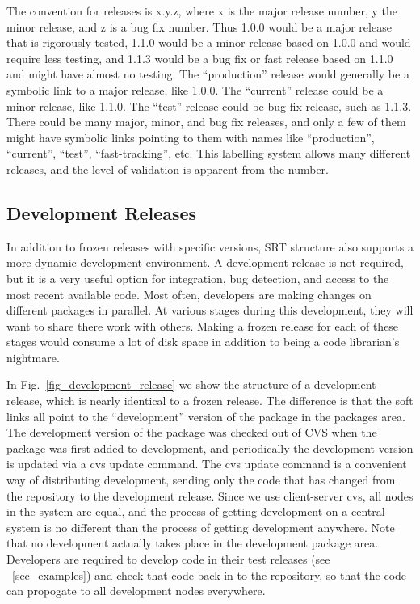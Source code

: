 \documentclass[12pt]{article}
\begin{document}
The convention for releases is x.y.z, where x is the 
major release number,
y the minor release, and z is a bug fix 
number. Thus 1.0.0 would be a major
release that is rigorously tested,  1.1.0 would be a minor release based on 
1.0.0 and would require less testing, and 1.1.3 would be a bug fix or fast 
release based on 1.1.0 and might have almost no testing.  The ``production''
release would generally be a symbolic link to a major release, like 1.0.0.
The ``current'' release could be a minor release, like 1.1.0. The ``test'' release 
could be bug fix release, such as 1.1.3.  There could be many major, minor,
and bug fix releases, and only a few of them might have symbolic links pointing
to them with names like ``production'', ``current'', ``test'',
``fast-tracking'', etc.
This labelling system allows many different releases, and the level of
validation is apparent from the number.

\subsection{Development Releases}
\label{sec_development}

In addition to frozen releases with specific versions, SRT structure
also supports a more dynamic development environment. A development release is 
not required, but it is a very useful option for integration, bug detection,
and access to the most recent available code. Most often, 
developers are making changes on different packages in parallel. At
various stages during this development, they will want to share there
work with others. Making a frozen release for each of these stages
would consume a lot of disk space in addition to being a code librarian's
nightmare. 

In Fig.~\ref{fig_development_release} we show the structure of a development
release, which is nearly identical to a frozen release.  The difference is that
the soft links all point to the ``development'' version of the package in the
packages area.  The development version of the package was checked out of
CVS when the package was first added to development, and periodically the 
development version is updated via a {\ttfamily cvs update} command. The 
{\ttfamily cvs update} command is a convenient way of distributing 
development, sending only the code that has changed from the repository to the 
development release.  Since we use client-server cvs, all nodes in the system 
are equal, and the process of getting development on a central system is no 
different than the process of getting development anywhere.  Note that no
development actually takes place in the development package area. Developers
are required to develop code in their test releases (see ~\ref{sec_examples}) and check
that code back in to the repository, so that the code can propogate to all
development nodes everywhere. 
\end{document}
